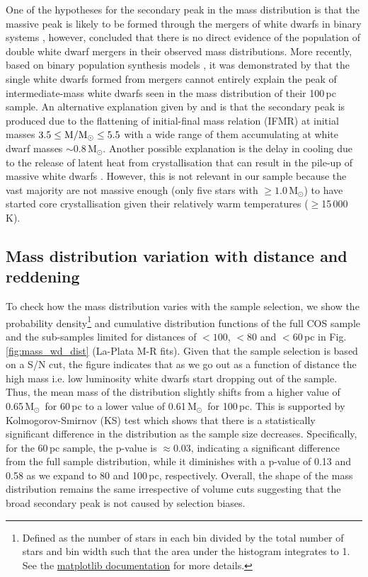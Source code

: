 \documentclass[fleqn,usenatbib, useAMS]{mnras}
\newcommand{\Msun}{\mbox{$\mathrm{M_\odot}$}}
\begin{document}
One of the hypotheses for the secondary peak in the mass distribution is that the massive peak is likely to be formed through the mergers of white dwarfs in binary systems \citep{Liebert2005, Kleinman2013, Rebassa2015,Kilic2018}, however, \cite{Tremblay2016} concluded that there is no direct evidence of the population of double white dwarf mergers in their observed mass distributions. More recently, based on binary population synthesis models \citep{temmink2020}, it was demonstrated by \cite{Kilic2020} that the single white dwarfs formed from mergers cannot entirely explain the peak of intermediate-mass white dwarfs seen in the mass distribution of their 100\,pc sample. An alternative explanation given by \cite{Tremblay2016} and \cite{Kareem2018} is that the secondary peak is produced due to the flattening of initial-final mass relation (IFMR) at initial masses $3.5\leq\rm{M}/\Msun\leq 5.5$ 
with a wide range of them accumulating at white dwarf masses $\sim$0.8\,\Msun. 
Another possible explanation is the delay in cooling due to the release of latent heat from crystallisation that can result in the pile-up of massive white dwarfs \citep{Kilic2020}. However, this is not relevant in our sample because the vast majority are not massive enough (only five stars with $\geq1.0\,\Msun$) to have started core crystallisation given their relatively warm temperatures ($\geq$15\,000\,K). 

\subsection{Mass distribution variation with distance and reddening}
To check how the mass distribution varies with the sample selection, we show the probability density\footnote{Defined as the number of stars in each bin divided by the total number of stars and bin width such that the area under the histogram integrates to 1. See the \href{https://matplotlib.org/stable/api/_as_gen/matplotlib.pyplot.hist.html}{matplotlib documentation} for more details.} and cumulative distribution functions of the full COS sample and the sub-samples limited for distances of $<100$, $<80$ and $<60$\,pc in Fig.\,\ref{fig:mass_wd_dist} (La-Plata M-R fits). Given that the sample selection is based on a S/N cut, the figure indicates that as we go out as a function of distance the high mass i.e. low luminosity white dwarfs start dropping out of the sample. Thus, the mean mass of the distribution slightly shifts from a higher value of 0.65\,\Msun\ for 60\,pc to a lower value of 0.61\,\Msun\ for 100\,pc. This is supported by Kolmogorov-Smirnov (KS) test which shows that there is a statistically significant difference in the distribution as the sample size decreases. Specifically, for the 60\,pc sample, the p-value is $\approx0.03$, indicating a significant difference from the full sample distribution, 
while it diminishes with a p-value of 0.13 and 0.58 as we expand to 80 and 100\,pc, respectively. Overall, the shape of the mass distribution remains the same irrespective of volume cuts suggesting that the broad secondary peak is not caused by selection biases. 
\end{document}
